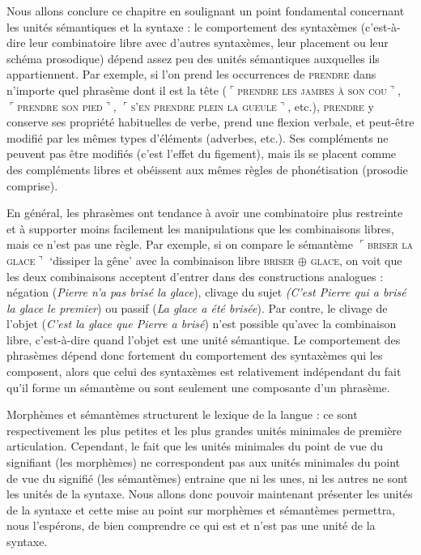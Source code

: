 Nous allons conclure ce chapitre en soulignant un point fondamental concernant les unités sémantiques et la syntaxe : le comportement des syntaxèmes (c’est-à-dire leur combinatoire libre avec d’autres syntaxèmes, leur placement ou leur schéma prosodique) dépend assez peu des unités sémantiques auxquelles ils appartiennent. Par exemple, si l’on prend les occurrences de \textsc{prendre} dans n’importe quel phrasème dont il est la tête ($⌜$\textsc{prendre} \textsc{les} \textsc{jambes} \textsc{à} \textsc{son} \textsc{cou}$⌝$, $⌜$\textsc{prendre} \textsc{son} \textsc{pied}$⌝$, $⌜$\textsc{s’en} \textsc{prendre} \textsc{plein} \textsc{la} \textsc{gueule}$⌝$, etc.), \textsc{prendre} y conserve ses propriété habituelles de verbe, prend une flexion verbale, et peut-être modifié par les mêmes types d’éléments (adverbes, etc.). Ses compléments ne peuvent pas être modifiés (c’est l’effet du figement), mais ils se placent comme des compléments libres et obéissent aux mêmes règles de phonétisation (prosodie comprise).

En général, les phrasèmes ont tendance à avoir une combinatoire plus restreinte et à supporter moins facilement les manipulations que les combinaisons libres, mais ce n’est pas une règle. Par exemple, si on compare le sémantème $⌜$\textsc{briser} \textsc{la} \textsc{glace}$⌝$ ‘dissiper la gêne’ avec la combinaison libre \textsc{briser} \textsc{${\oplus}$ glace}, on voit que les deux combinaisons acceptent d’entrer dans des constructions analogues : négation (\textit{Pierre n’a pas brisé la glace}), clivage du sujet \textit{(C’est Pierre qui a brisé la glace le premier}) ou passif (\textit{La glace a été brisée}). Par contre, le clivage de l’objet (\textit{C’est la glace que Pierre a brisé}) n’est possible qu’avec la combinaison libre, c’est-à-dire quand l’objet est une unité sémantique. Le comportement des phrasèmes dépend donc fortement du comportement des syntaxèmes qui les composent, alors que celui des syntaxèmes est relativement indépendant du fait qu’il forme un sémantème ou sont seulement une composante d’un phrasème.

Morphèmes et sémantèmes structurent le lexique de la langue : ce sont respectivement les plus petites et les plus grandes unités minimales de première articulation. Cependant, le fait que les unités minimales du point de vue du signifiant (les morphèmes) ne correspondent pas aux unités minimales du point de vue du signifié (les sémantèmes) entraine que ni les unes, ni les autres ne sont les unités de la syntaxe. Nous allons donc pouvoir maintenant présenter les unités de la syntaxe et cette mise au point sur morphèmes et sémantèmes permettra, nous l’espérons, de bien comprendre ce qui est et n’est pas une unité de la syntaxe.

